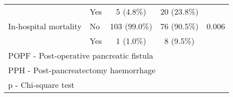 \begin{table}[p]
\begin{tabular}{|l l c c c|}
		                         & Yes           & 5 (4.8\%)    & 20 (23.8\%)  &  \\
		In-hospital mortality    & No            & 103 (99.0\%) & 76 (90.5\%)  & 0.006          \\
		                         & Yes           & 1 (1.0\%)    & 8 (9.5\%)    &  \\ \hline
		\multicolumn{5}{l}{POPF - Post-operative pancreatic fistula}                            \\
		\multicolumn{5}{l}{PPH - Post-pancreatectomy haemorrhage}                               \\
		\multicolumn{5}{l}{p - Chi-square test}
	\end{tabular}
\end{table}
